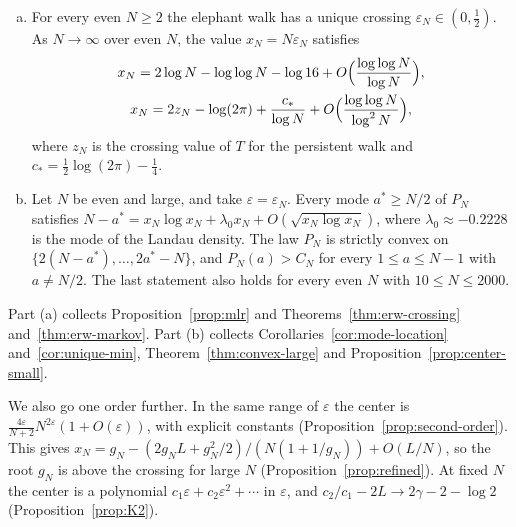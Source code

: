 \begin{mainthm}
\begin{enumerate}[(a)]
\item For every even $N\ge2$ the elephant walk has a unique crossing
$\varepsilon_N\in(0,\frac12)$. As $N\to\infty$ over even $N$, the value
$x_N=N\varepsilon_N$ satisfies
\begin{gather*}
 x_N=2\log N-\log\log N-\log16+O\Bigl(\frac{\log\log N}{\log N}\Bigr),\\
 x_N=2z_N-\log(2\pi)+\frac{c_*}{\log N}+O\Bigl(\frac{\log\log N}{\log^2N}\Bigr),
\end{gather*}
where $z_N$ is the crossing value of $T$ for the persistent walk and
$c_*=\frac12\log(2\pi)-\frac14$.
\item Let $N$ be even and large, and take $\varepsilon=\varepsilon_N$. Every
mode $a^*\ge N/2$ of $P_N$ satisfies
$N-a^*=x_N\log x_N+\lambda_0x_N+O(\sqrt{x_N\log x_N})$, where
$\lambda_0\approx-0.2228$ is the mode of the Landau density. The law $P_N$ is
strictly convex on $\{2(N-a^*),\dots,2a^*-N\}$, and $P_N(a)>C_N$ for every
$1\le a\le N-1$ with $a\ne N/2$. The last statement also holds for every even
$N$ with $10\le N\le2000$.
\end{enumerate}
\end{mainthm}

Part (a) collects Proposition~\ref{prop:mlr} and
Theorems~\ref{thm:erw-crossing} and~\ref{thm:erw-markov}. Part (b) collects
Corollaries~\ref{cor:mode-location} and~\ref{cor:unique-min},
Theorem~\ref{thm:convex-large} and Proposition~\ref{prop:center-small}.

We also go one order further. In the same range of $\varepsilon$ the center
is $\frac{4\varepsilon}{N+2}N^{2\varepsilon}(1+O(\varepsilon))$, with
explicit constants (Proposition~\ref{prop:second-order}). This gives
$x_N=g_N-(2g_NL+g_N^2/2)/(N(1+1/g_N))+O(L/N)$, so the root $g_N$ is above the
crossing for large $N$ (Proposition~\ref{prop:refined}). At fixed $N$ the
center is a polynomial $c_1\varepsilon+c_2\varepsilon^2+\cdots$ in
$\varepsilon$, and $c_2/c_1-2L\to2\gamma-2-\log2$
(Proposition~\ref{prop:K2}).

